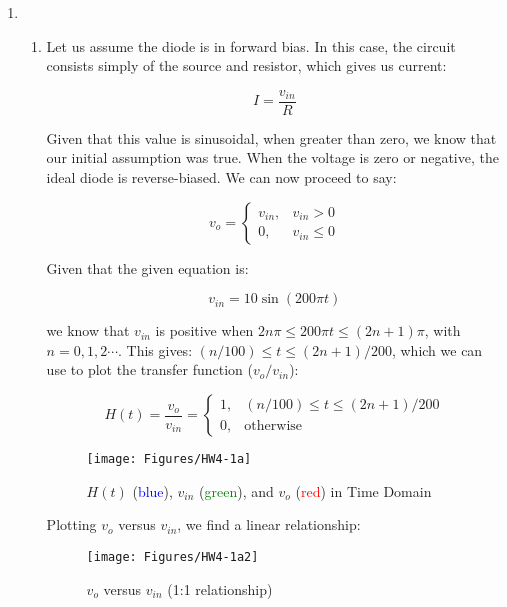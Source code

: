 \begin{enumerate}

  \item

    \begin{enumerate}

      \item 

        Let us assume the diode is in forward bias. In this case, the circuit consists simply of the source and resistor, which gives us current:

        $$I=\frac{v_{in}}{R}$$

        Given that this value is  sinusoidal, when greater than zero, we know that our initial assumption was true. When the voltage is zero or negative, the ideal diode is reverse-biased. We can now proceed to say:

        $$v_o=\left\{\begin{array}{ll} v_{in}, & v_{in}>0\\ 0, & v_{in}\leq 0\end{array}$$

          Given that the given equation is:

          $$v_{in}=10\sin(200\pi t)$$

          we know that $v_{in}$ is positive when $2n\pi\leq 200\pi t\leq (2n+1)\pi$, with $n=0,1,2\cdots$. This gives: $(n/100)\leq t\leq (2n+1)/200$, which we can use to plot the transfer function ($v_o/v_{in}$):

          $$H(t)=\frac{v_o}{v_{in}}=\left\{\begin{array}{ll} 1, & (n/100)\leq t\leq (2n+1)/200\\ 0, & \text{otherwise}\end{array}$$

            \begin{figure}[H]
              \centering
              \texttt{[image: Figures/HW4-1a]}
              \caption{$H(t)$ (\textcolor{blue}{blue}), $v_{in}$ (\textcolor{green}{green}), and $v_{o}$ (\textcolor{red}{red}) in Time Domain}
              \label{fig:1}
            \end{figure}

            Plotting $v_o$ versus $v_{in}$, we find a linear relationship:

            \begin{figure}[H]
              \centering
              \texttt{[image: Figures/HW4-1a2]}
              \caption{$v_o$ versus $v_{in}$ (1:1 relationship)}
              \label{fig:2}
            \end{figure}



\end{enumerate}
\end{enumerate}
